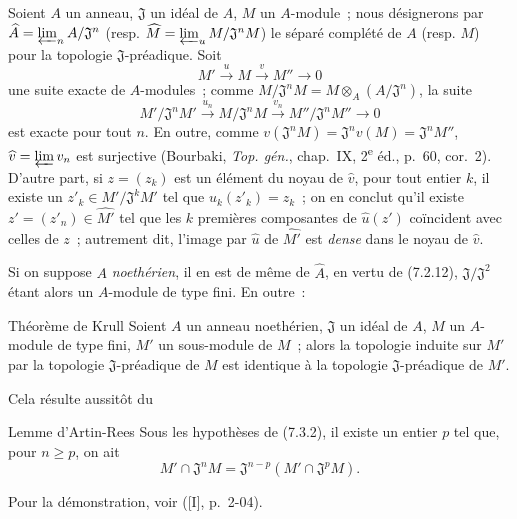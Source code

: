 \begin{env}[7.3.1]
\label{0.7.3.1-fr}
Soient $A$ un anneau, $\mathfrak J$ un idéal de $A$, $M$ un $A$-module~;
nous désignerons par
$\widehat A=\varprojlim_n A/\mathfrak J^n$ (resp.
$\widehat M=\varprojlim_u M/\mathfrak J^nM$) le séparé complété de $A$
(resp. $M$) pour la topologie $\mathfrak J$-préadique. Soit
\[
  M'\xrightarrow{u}M\xrightarrow{v}M''\to0
\]
une suite exacte de $A$-modules~; comme
$M/\mathfrak J^nM=M\otimes_A(A/\mathfrak J^n)$, la suite
\[
  M'/\mathfrak J^nM'\xrightarrow{u_n}
  M/\mathfrak J^nM\xrightarrow{v_n}
  M''/\mathfrak J^nM''\to0
\]
est exacte pour tout $n$. En outre, comme
$v(\mathfrak J^nM)=\mathfrak J^nv(M)=\mathfrak J^nM''$,
$\widehat v=\varprojlim v_n$ est surjective (Bourbaki,
\emph{Top. gén.}, chap.~IX, 2\textsuperscript{e} éd., p.~60, cor.~2).
D'autre part, si $z=(z_k)$ est un élément du noyau de $\widehat v$, pour tout
entier $k$, il existe un $z'_k\in M'/\mathfrak J^kM'$ tel que
$u_k(z'_k)=z_k$~; on en conclut qu'il existe
$z'=(z'_n)\in\widehat{M'}$ tel que les $k$ premières composantes de
$\widehat u(z')$ coïncident avec celles de $z$~; autrement dit, l'image par
$\widehat u$ de $\widehat{M'}$ est \emph{dense} dans le noyau de
$\widehat v$.

Si on suppose $A$ \emph{noethérien}, il en est de même de $\widehat A$, en
vertu de (7.2.12), $\mathfrak J/\mathfrak J^2$ étant alors un $A$-module de
type fini. En outre~:
\end{env}

\begin{namedtheorem}[7.3.2]{Théorème de Krull}
\label{0.7.3.2-fr}
Soient $A$ un anneau noethérien, $\mathfrak J$ un idéal de $A$, $M$ un
$A$-module de type fini, $M'$ un sous-module de $M$~; alors la topologie
induite sur $M'$ par la topologie $\mathfrak J$-préadique de $M$ est identique
à la topologie $\mathfrak J$-préadique de $M'$.
\end{namedtheorem}

Cela résulte aussitôt du

\begin{namedlemma}[7.3.2.1]{Lemme d'Artin-Rees}
\label{0.7.3.2.1-fr}
Sous les hypothèses de (7.3.2), il existe un entier $p$ tel que, pour
$n\geq p$, on ait
\[
  M'\cap\mathfrak J^nM=\mathfrak J^{n-p}
  (M'\cap\mathfrak J^pM).
\]
\end{namedlemma}

Pour la démonstration, voir ([I], p.~2-04).

